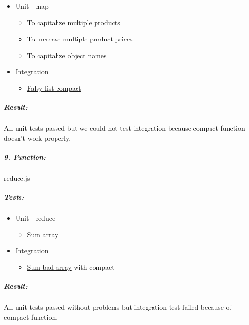 \documentclass[a4paper, 12pt]{article}
\begin{document}
		\begin{itemize}
		\item
		Unit - map
		
		\begin{itemize}
			\item
			\underline{To capitalize multiple products}
			\item
			To increase multiple product prices
			\item
			To capitalize object names
		\end{itemize}
		\item
		Integration
		
		\begin{itemize}
			\item
			\underline{Falsy list compact}
		\end{itemize}
		\end{itemize}
		
		\hypertarget{header-n303}{%
		\subparagraph{Result:}\label{header-n303}}
		
		All unit tests passed but we could not test integration because compact
		function doesn't work properly.


		
		\hypertarget{header-n423}{%
		\subparagraph{9. Function:}\label{header-n423}}
		
		reduce.js
		
		\hypertarget{header-n425}{%
		\subparagraph{Tests:}\label{header-n425}}
		
		\begin{itemize}
		\item
		Unit - reduce
		
		\begin{itemize}
			\item
			\underline{Sum array}
		\end{itemize}
		\end{itemize}
		
		\begin{itemize}
		\item
		Integration
		
		\begin{itemize}
			\item
			\underline{Sum bad array} with compact
		\end{itemize}
		\end{itemize}
		
		\hypertarget{header-n438}{%
		\subparagraph{Result:}\label{header-n438}}
		
		All unit tests passed without problems but integration test failed
		because of compact function.
\end{document}
